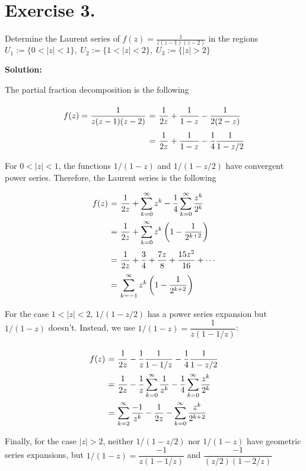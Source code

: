 \section*{Exercise 3.}

Determine the Laurent series of $f(z) = \frac{1}{z(z-1)(z-2)}$ in the regions $U_1 := \{0<|z|<1\},\; U_2 := \{1<|z|<2\},\; U_3 := \{|z|>2\}$

\textbf{Solution:}

The partial fraction decomposition is the following
\[ \everymath{\displaystyle}
\arraycolsep=1.8pt\def\arraystretch{2.5}
\begin{array}{rcl}
    f(z) = \frac{1}{z(z-1)(z-2)} & = & \frac{1}{2z} + \frac{1}{1-z} - \frac{1}{2(2-z)}\\
    & = & \frac{1}{2z} + \frac{1}{1-z} - \frac{1}{4}\frac{1}{1-z/2}
\end{array}\]

For $0<|z|<1 $, the functions $1/(1-z)$ and $1/(1-z/2)$ have convergent power series. Therefore, the Laurent series is the following
\[ \everymath{\displaystyle}
\arraycolsep=1.8pt\def\arraystretch{2.5}
\begin{array}{rcl}
    f(z) & = & \frac{1}{2z} + \sum_{k = 0}^{\infty} z^k - \frac{1}{4} \sum_{k = 0}^{\infty} \frac{z^k}{2^k}\\
    & = & \frac{1}{2z} + \sum_{k = 0}^{\infty} z^k \left( 1-\frac{1}{2^{k+2}} \right)\\
    & = & \frac{1}{2z} + \frac{3}{4} + \frac{7z}{8} + \frac{15z^2}{16} + \cdots\\
    & = & \sum_{k = -1}^{\infty} z^k \left( 1-\frac{1}{2^{k+2}}\right)
\end{array} \]

For the case $1<|z|<2$, $1/(1-z/2)$ has a power series expansion but $1/(1-z)$ doesn't. Instead, we use $1/(1-z) = \dfrac{1}{z(1-1/z)}$:
\[ \everymath{\displaystyle}
\arraycolsep=1.8pt\def\arraystretch{2.5}
\begin{array}{rcl}
    f(z) & = & \frac{1}{2z} - \frac{1}{z}\frac{1}{1-1/z} - \frac{1}{4}\frac{1}{1-z/2}\\
    & = & \frac{1}{2z} - \frac{1}{z}\sum_{k = 0}^{\infty} \frac{1}{z^k} - \frac{1}{4} \sum_{k = 0}^{\infty} \frac{z^k}{2^k}\\
    & = & \sum_{k = 2}^{\infty} \frac{-1}{z^k} - \frac{1}{2z} - \sum_{k = 0}^{\infty} \frac{z^k}{2^{k+2}}
\end{array} \]

Finally, for the case $|z|>2$, neither $1/(1-z/2)$ nor $1/(1-z)$ have geometric series expansions, but $1/(1-z) = \dfrac{-1}{z(1-1/z)}$ and $\dfrac{-1}{(z/2)(1-2/z)}$

